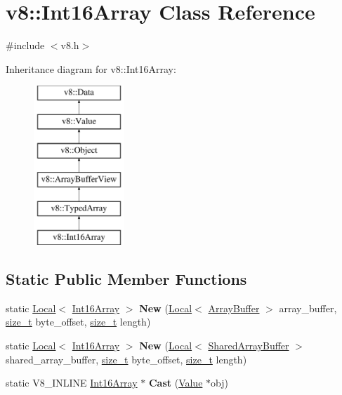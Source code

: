\hypertarget{classv8_1_1Int16Array}{}\section{v8\+:\+:Int16\+Array Class Reference}
\label{classv8_1_1Int16Array}


{\ttfamily \#include $<$v8.\+h$>$}

Inheritance diagram for v8\+:\+:Int16\+Array\+:\begin{figure}[H]
\begin{center}
\leavevmode
\includegraphics[height=6.000000cm]{classv8_1_1Int16Array}
\end{center}
\end{figure}
\subsection*{Static Public Member Functions}
\begin{DoxyCompactItemize}
\item 
\mbox{\label{classv8_1_1Int16Array_a6e102d644c3f96345bcf212673b96090}} 
static \mbox{\hyperlink{classv8_1_1Local}{Local}}$<$ \mbox{\hyperlink{classv8_1_1Int16Array}{Int16\+Array}} $>$ {\bfseries New} (\mbox{\hyperlink{classv8_1_1Local}{Local}}$<$ \mbox{\hyperlink{classv8_1_1ArrayBuffer}{Array\+Buffer}} $>$ array\+\_\+buffer, \mbox{\hyperlink{classsize__t}{size\+\_\+t}} byte\+\_\+offset, \mbox{\hyperlink{classsize__t}{size\+\_\+t}} length)
\item 
\mbox{\label{classv8_1_1Int16Array_a9634021f52042c976091549358731432}} 
static \mbox{\hyperlink{classv8_1_1Local}{Local}}$<$ \mbox{\hyperlink{classv8_1_1Int16Array}{Int16\+Array}} $>$ {\bfseries New} (\mbox{\hyperlink{classv8_1_1Local}{Local}}$<$ \mbox{\hyperlink{classv8_1_1SharedArrayBuffer}{Shared\+Array\+Buffer}} $>$ shared\+\_\+array\+\_\+buffer, \mbox{\hyperlink{classsize__t}{size\+\_\+t}} byte\+\_\+offset, \mbox{\hyperlink{classsize__t}{size\+\_\+t}} length)
\item 
\mbox{\label{classv8_1_1Int16Array_abef12f11ace9c74a4ce451db28b954e5}} 
static V8\+\_\+\+I\+N\+L\+I\+NE \mbox{\hyperlink{classv8_1_1Int16Array}{Int16\+Array}} $\ast$ {\bfseries Cast} (\mbox{\hyperlink{classv8_1_1Value}{Value}} $\ast$obj)
\end{DoxyCompactItemize}

